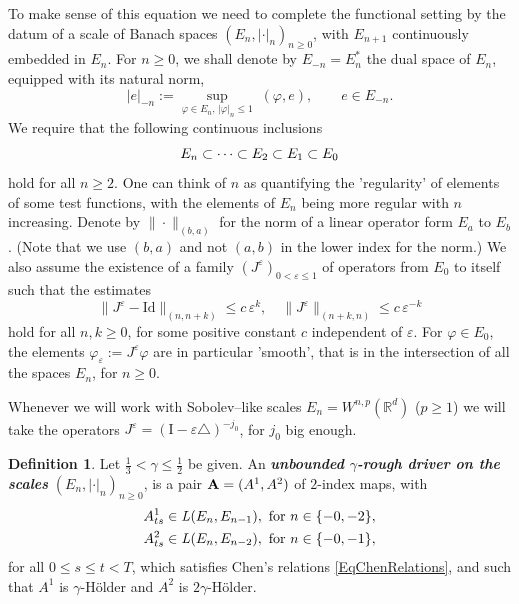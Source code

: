 \documentclass[11pt,a4paper]{amsart}
\newcommand{\RR}{\mathbb{R}}  \newcommand{\CC}{\mathbb{C}}  \newcommand{\LL}{\mathbb{L}}  \newcommand{\WW}{\mathbb{W}}
\renewcommand{\leq}{\leqslant}
\renewcommand{\geq}{\geqslant}
\theoremstyle{plain}%
\theoremstyle{definition}
\newtheorem{definition}[theorem]{Definition}
\theoremstyle{remark}
\numberwithin{equation}{section} %
\begin{document}
To make sense of this equation we need to complete the functional setting by the datum of a scale of Banach spaces $(E_n,|\cdot|_n)_{n\geq 0}$, with $E_{n+1}$ continuously embedded in $E_n$. For $n\geq 0$, we shall denote by $E_{-n}=E_n^*$ the dual space of $E_n$, equipped with its natural norm, 
$$
|e|_{-n} := \underset{\varphi\in E_n,\,|\varphi|_n\leq 1}{\sup}\; (\varphi,e), \quad\quad e\in E_{-n}.
$$
We require that the following continuous inclusions 
\begin{equation*}
E_n\subset \cdots\subset E_2\subset E_1\subset E_0 \\ 
\end{equation*}
hold for all $n\geq 2$. One can think of $n$ as quantifying the 'regularity' of elements of some test functions, with the elements of $E_n$ being more regular with $n$ increasing. Denote by $\|\cdot\|_{(b,a)}$ for the norm of a linear operator form $E_a$ to $E_b$. (Note that we use $(b,a)$ and not $(a,b)$ in the lower index for the norm.) We also assume the existence of a family $(J^\varepsilon)_{0<\varepsilon\leq 1}$ of operators from $E_0$ to itself such that the estimates
\begin{equation}
\label{EqApproximationProperties}
\|J^\varepsilon - \textrm{Id} \|_{(n,n+k)} \leq c\,\varepsilon^k, \quad \| J^\varepsilon \|_{(n+k,n )} \leq c\,\varepsilon^{- k}
\end{equation}
hold for all $n, k \geq 0$, for some positive constant $c$ independent of $\varepsilon$. For $\varphi\in E_0$, the elements $\varphi_\varepsilon := J^\varepsilon\varphi$ are in particular 'smooth', that is in the intersection of all the spaces $E_n$, for $n\geq 0$. 

Whenever we will work with Sobolev--like scales $E_n = W^{n,p}(\RR^d)$ ($p\ge 1$) we will take the operators $J^\varepsilon = (\textrm{I}-\varepsilon\triangle)^{-j_0}$, for $j_0$ big enough.


\smallskip

\begin{definition}
\label{DefnUnboundedRoughDriver}
Let $\frac{1}{3}<\gamma\leq \frac{1}{2}$ be given. An \textbf{\emph{unbounded $\gamma$-rough driver on the scales}} $(E_n,|\cdot|_n)_{n\geq 0}$, is a pair ${\bf A} = (A^1,A^2)$ of $2$-index maps, with 
\begin{equation}
\label{EqBoundednessAssumptionRoughDriver}
\begin{split}
&A^1_{ts}\in \textrm{\emph{L}}(E_n,E_{n-1}), \textrm{ for } n\in\{-0,-2\}, \\
&A^2_{ts}\in\textrm{\emph{L}}(E_n,E_{n-2}), \textrm{ for } n\in\{-0,-1\},
\end{split}
\end{equation}
for all $0\leq s\leq t<T$, which satisfies Chen's relations \eqref{EqChenRelations}, and such that $A^1$ is $\gamma$-H\"older and $A^2$ is $2\gamma$-H\"older. 
\end{definition}
\end{document}
